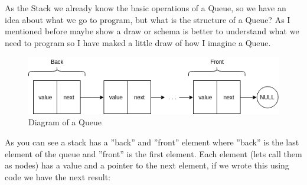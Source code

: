 As the Stack we already know the basic operations of a Queue, so we have an idea about what we go to program, but what is the structure of a Queue? As I mentioned before maybe show a draw or schema is better to understand what we need to program so I have maked a little draw of how I imagine a Queue.

\begin{figure}[H]
    \centering
    \includegraphics[width=1.00\textwidth]{Images/DataStructures/Queue/Queue.png}
    \caption{Diagram of a Queue}
    \label{fig:queue_diagram-01}
\end{figure}

As you can see a stack has a ''back'' and ''front'' element where ''back'' is the last element of the queue and ''front'' is the first element. Each element (lets call them as nodes) has a value and a pointer to the next element, if we wrote this using code we have the next result:

